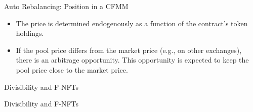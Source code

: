 \documentclass[handout]{beamer}
\begin{document}
\begin{frame}{Auto Rebalancing: Position in a CFMM}

	\begin{figure}	
		\centering
		
	\end{figure}

	\begin{itemize}
		\item<1-> The price is determined endogenously as a function of the contract's token holdings.
	
		\item<2->If the pool price differs from the market price (e.g., on other exchanges), there is an arbitrage opportunity. This opportunity is expected to keep the pool price close to the market price.
	\end{itemize}

\end{frame}
	



\begin{frame}{Divisibility and F-NFTs}

	
	\vspace{2em}
	\begin{tikzpicture}
		
	\end{tikzpicture}	

\end{frame}

\begin{frame}{Divisibility and F-NFTs}

	
	\vspace{2em}
	\begin{tikzpicture}
		
	\end{tikzpicture}	

\end{frame}
\end{document}
